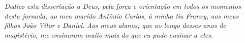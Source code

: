 
\begin{dedicatoria}
	\vspace*{\fill}
	\centering
	\noindent
	\begin{flushright}
		\begin{minipage}{10cm}
			\emph{Dedico esta dissertação a Deus, pela força e orientação em todos os momentos desta jornada, ao meu marido Antônio Carlos, à minha tia Francy, aos meus filhos João Vítor e Daniel.
   Aos meus alunos, que ao longo desses anos de magistério, me ensinaram muito mais do que eu pude ensinar a eles.}
		\end{minipage}
	\end{flushright}
	\vspace{3cm}
\end{dedicatoria}
